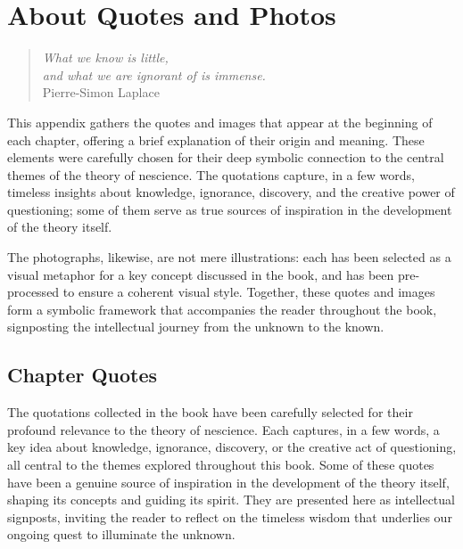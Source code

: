 %
%


\chapter{About Quotes and Photos}
\label{apx:photos}

\begin{quote}
\begin{flushright}
\emph{What we know is little, \\
and what we are ignorant of is immense.}\\
Pierre-Simon Laplace
\end{flushright}
\end{quote}
\bigskip

This appendix gathers the quotes and images that appear at the beginning of each chapter, offering a brief explanation of their origin and meaning. These elements were carefully chosen for their deep symbolic connection to the central themes of the theory of nescience. The quotations capture, in a few words, timeless insights about knowledge, ignorance, discovery, and the creative power of questioning; some of them serve as true sources of inspiration in the development of the theory itself.

The photographs, likewise, are not mere illustrations: each has been selected as a visual metaphor for a key concept discussed in the book, and has been pre-processed to ensure a coherent visual style. Together, these quotes and images form a symbolic framework that accompanies the reader throughout the book, signposting the intellectual journey from the unknown to the known.

%
%

\section{Chapter Quotes}

The quotations collected in the book have been carefully selected for their profound relevance to the theory of nescience. Each captures, in a few words, a key idea about knowledge, ignorance, discovery, or the creative act of questioning, all central to the themes explored throughout this book. Some of these quotes have been a genuine source of inspiration in the development of the theory itself, shaping its concepts and guiding its spirit. They are presented here as intellectual signposts, inviting the reader to reflect on the timeless wisdom that underlies our ongoing quest to illuminate the unknown.

